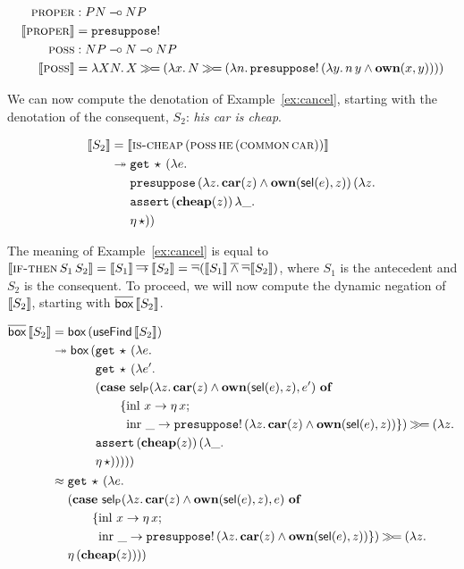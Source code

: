 \begin{align*}
  \textsc{proper} &: PN \mathbin{{-}\mkern-3.5mu{\circ}} NP \\
  \llbracket \textsc{proper} \rrbracket &= \mathtt{presuppose}! \\
  \textsc{poss} &: NP \mathbin{{-}\mkern-3.5mu{\circ}} N \mathbin{{-}\mkern-3.5mu{\circ}} NP \\
  \llbracket \textsc{poss} \rrbracket &= \lambda X N.\, X \mathbin{\gg\!=} (\lambda x.\, N \mathbin{\gg\!=} (\lambda n.\, \mathtt{presuppose}!\,(\lambda y.\, n\,y \land \textbf{own}(x, y))))
\end{align*}

We can now compute the denotation of Example~\ref{ex:cancel}, starting with
the denotation of the consequent, $S_2$: \emph{his car is cheap}.

\begin{align*}
  \llbracket S_2 \rrbracket
  &= \llbracket \textsc{is-cheap}\,(\textsc{poss}\,\textsc{he}\,(\textsc{common}\,\textsc{car})) \rrbracket \\
  &\twoheadrightarrow \begin{aligned}[t]
    &\mathtt{get}\,\star\,(\lambda e.\,  \\
    &\mathtt{presuppose}\,(\lambda z.\, \textbf{car}(z) \land \textbf{own}(\textsf{sel}(e), z))\,(\lambda z.\,  \\
    &\mathtt{assert}\,(\textbf{cheap}(z))\,\lambda \_.\,  \\
    &\eta\,\star))
    \end{aligned}
\end{align*}

The meaning of Example~\ref{ex:cancel} is equal to
$\llbracket \textsc{if-then}\,S_1\,S_2 \rrbracket = \llbracket S_1 \rrbracket \mathbin{\overline{\to}} \llbracket S_2 \rrbracket =
\mathop{\overline{\lnot}}(\llbracket S_1 \rrbracket \mathbin{\overline{\land}} \mathop{\overline{\lnot}} \llbracket S_2 \rrbracket)$, where $S_1$ is the antecedent and
$S_2$ is the consequent. To proceed, we will now compute the dynamic
negation of $\llbracket S_2 \rrbracket$, starting with $\overline{\textsf{box}}\,\llbracket S_2 \rrbracket$.

\begin{align*}
  \overline{\textsf{box}}\,\llbracket S_2 \rrbracket
  &= \textsf{box}\,(\textsf{useFind}\,\llbracket S_2 \rrbracket) \\
  &\twoheadrightarrow \textsf{box}\,(\begin{aligned}[t]
     &\mathtt{get}\,\star\,(\lambda e.\,  \\
     &\mathtt{get}\,\star\,(\lambda e'.\,  \\
     &(\text{\textbf{case} $\textsf{sel}_{\textsf{P}}(\lambda z.\, \textbf{car}(z) \land \textbf{own}(\textsf{sel}(e), z), e')$ \textbf{of}} \\ &\qquad \{\operatorname{inl}\,x \to \eta\,x; \\ &\qquad \ \operatorname{inr}\,\_ \to \mathtt{presuppose}!\,(\lambda z.\, \textbf{car}(z) \land \textbf{own}(\textsf{sel}(e), z)) \}) \mathbin{\gg\!=} (\lambda z.\,  \\
     &\mathtt{assert}\,(\textbf{cheap}(z))\,(\lambda \_.\,  \\
     &\eta\,\star)))))
     \end{aligned} \\
  &\approx \begin{aligned}[t]
     &\mathtt{get}\,\star\,(\lambda e.\,  \\
     &(\text{\textbf{case} $\textsf{sel}_{\textsf{P}}(\lambda z.\, \textbf{car}(z) \land \textbf{own}(\textsf{sel}(e), z), e)$ \textbf{of}} \\ &\qquad \{\operatorname{inl}\,x \to \eta\,x; \\ &\qquad \ \operatorname{inr}\,\_ \to \mathtt{presuppose}!\,(\lambda z.\, \textbf{car}(z) \land \textbf{own}(\textsf{sel}(e), z)) \}) \mathbin{\gg\!=} (\lambda z.\,  \\
     &\eta\,(\textbf{cheap}(z))))
     \end{aligned}
\end{align*}

